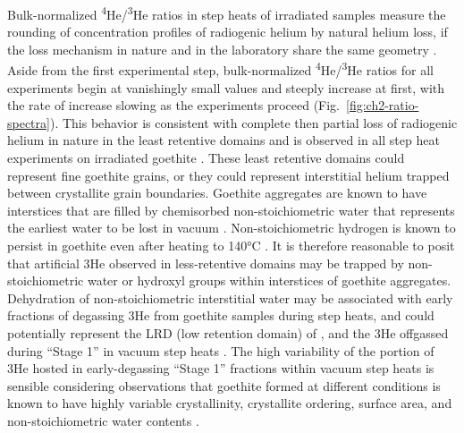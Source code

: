 Bulk-normalized \textsuperscript{4}He/\textsuperscript{3}He ratios in step heats of irradiated samples
measure the rounding of concentration profiles of radiogenic helium by natural helium loss, if the
loss mechanism in nature and in the laboratory share the same geometry
\citep{shusterfarley2004,farley2024}. Aside from the first
experimental step, bulk-normalized \textsuperscript{4}He/\textsuperscript{3}He ratios for all experiments begin
at vanishingly small values and steeply increase at first, with the rate
of increase slowing as the experiments proceed (Fig.~\ref{fig:ch2-ratio-spectra}). This
behavior is consistent with complete then partial loss of radiogenic
helium in nature in the least retentive domains and is observed in all
step heat experiments on irradiated goethite \citep{farley2024}. 
These least retentive domains could represent fine goethite grains, or they could represent 
interstitial helium trapped between crystallite grain boundaries.
Goethite aggregates are known to have interstices that are filled by
chemisorbed non-stoichiometric water that represents the earliest water
to be lost in vacuum \citep{naono1987}. Non-stoichiometric hydrogen
is known to persist in goethite even after heating to 140°C \citep{yapppoths1995}. It is therefore reasonable to posit that artificial 3He
observed in less-retentive domains may be trapped by non-stoichiometric
water or hydroxyl groups within interstices of goethite aggregates.
Dehydration of non-stoichiometric interstitial water may be associated
with early fractions of degassing 3He from goethite samples
during step heats, and could potentially represent the LRD (low retention
domain) of \citet{shustervasconcelos2005}, and the 3He offgassed during ``Stage
1'' in vacuum step heats \citep{farley2024}. The high variability of
the portion of 3He hosted in early-degassing ``Stage 1'' fractions
within vacuum step heats is sensible considering observations that
goethite formed at different conditions is known to have highly
variable crystallinity, crystallite ordering, surface area, and
non-stoichiometric water contents \citep{schwertmann1985}. 


